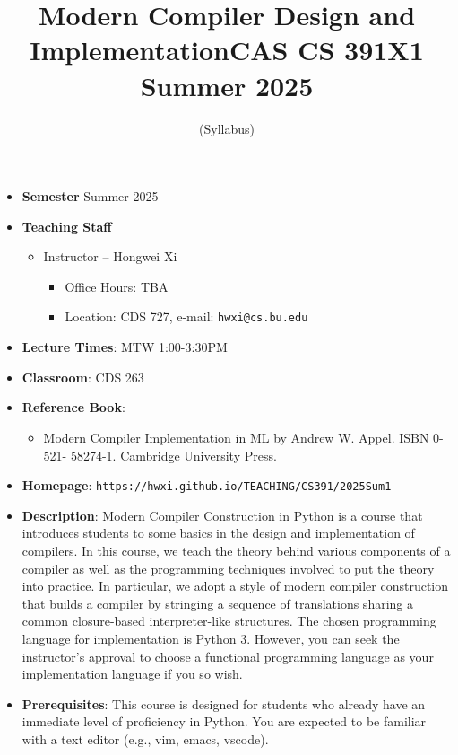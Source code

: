 \documentclass[11pt]{article}
\title{Modern Compiler Design and Implementation\break CAS CS 391X1 Summer 2025}
\author{(Syllabus)}
\date{}
\begin{document}
\maketitle
\thispagestyle{empty}

\begin{itemize}
\item {\bf Semester} Summer 2025
\item {\bf Teaching Staff}
\begin{itemize}
\item
Instructor -- Hongwei Xi
\begin{itemize}
\item
Office Hours: TBA
\item
Location: CDS 727, e-mail: \texttt{hwxi@cs.bu.edu}
\end{itemize}
\end{itemize}

\item {\bf Lecture Times}: MTW 1:00-3:30PM
\item {\bf Classroom}: CDS 263
\item {\bf Reference Book}:\kern6pt
\begin{itemize}
\item
Modern Compiler Implementation in ML by Andrew W. Appel. ISBN 0-521-
58274-1. Cambridge University Press.
\end{itemize}

\item {\bf Homepage}:
{\tt  https://hwxi.github.io/TEACHING/CS391/2025Sum1}

\item {\bf Description}:
Modern Compiler Construction in Python is a course that introduces
students to some basics in the design and implementation of
compilers. In this course, we teach the theory behind various
components of a compiler as well as the programming techniques
involved to put the theory into practice. In particular, we adopt a
style of modern compiler construction that builds a compiler by
stringing a sequence of translations sharing a common closure-based
interpreter-like structures.  The chosen programming language for
implementation is Python 3. However, you can seek the instructor’s
approval to choose a functional programming language as your
implementation language if you so wish.

\item {\bf Prerequisites}:
This course is designed for students who already have an immediate
level of proficiency in Python. You are expected to be familiar with a
text editor (e.g., vim, emacs, vscode).


\end{itemize}
\end{document}
